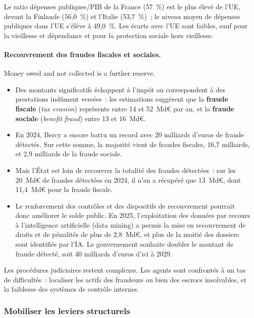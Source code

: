 Le ratio dépenses publiques/PIB de la France (57~\%) est le plus élevé de l'UE,
devant la Finlande (56,0~\%) et l'Italie (53,7~\%)~; le niveau moyen de
dépenses publiques dans l'UE s'élève à 49,0~\%. Les écarts avec l'UE sont
faibles, sauf pour la vieillesse et dépendance et pour la protection sociale
hors vieillesse.

\paragraph{Recouvrement des fraudes fiscales et sociales.}
Money owed and not collected is a further reserve.
\begin{itemize}
  \item Des montants significatifs échappent à l'impôt ou correspondent à des
    prestations indûment versées~: les estimations suggèrent que la
    \textbf{fraude fiscale} (\textit{tax evasion}) représente entre 14 et
    52~Md€ par an, et la \textbf{fraude sociale} (\textit{benefit fraud}) entre
    13 et 16~Md€.
  \item En 2024, Bercy a encore battu un record avec 20 milliards d'euros de
    fraude détectés. Sur cette somme, la majorité vient de fraudes fiscales,
    16,7 milliards, et 2,9 milliards de la fraude sociale.
  \item Mais l'État est loin de recouvrer la totalité des fraudes détectées~: sur
    les 20~Md€ de fraudes détectées en 2024, il n'en a récupéré que 13~Md€, dont
    11,4~Md€ pour la fraude fiscale.
  \item Le renforcement des contrôles et des dispositifs de recouvrement
    pourrait donc améliorer le solde public. En 2025, l'exploitation des données
    par recours à l'intelligence artificielle (data mining) a permis la mise en
    recouvrement de droits et de pénalités de plus de 2,8~Md€, et plus de la
    moitié des dossiers sont identifiés par l'IA. Le gouvernement souhaite
    doubler le montant de fraude détecté, soit 40 milliards d'euros d'ici à
    2029.
\end{itemize}

\begin{example}
  Les procédures judiciaires restent complexes. Les agents sont confrontés à un
  tas de difficultés~: localiser les actifs des fraudeurs ou bien des escrocs
  insolvables, et la faiblesse des systèmes de contrôle internes.
\end{example}

\subsubsection{Mobiliser les leviers structurels}

